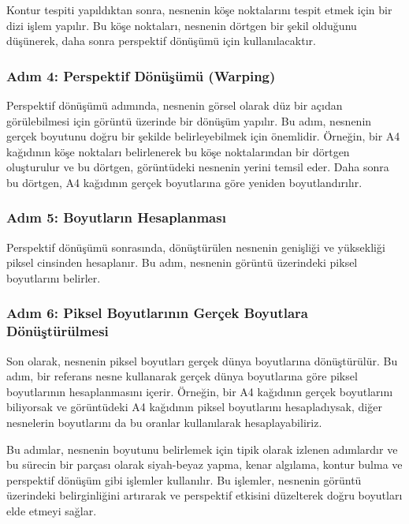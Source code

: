 \documentclass[11pt,a4paper]{report}
\begin{document}
\begin{justify}
   Kontur tespiti yapıldıktan sonra, nesnenin köşe noktalarını tespit etmek için bir dizi işlem yapılır. Bu köşe noktaları, nesnenin dörtgen bir şekil olduğunu düşünerek, daha sonra perspektif dönüşümü için kullanılacaktır.
   
   \subsubsection{Adım 4: Perspektif Dönüşümü (Warping)}
   Perspektif dönüşümü adımında, nesnenin görsel olarak düz bir açıdan görülebilmesi için görüntü üzerinde bir dönüşüm yapılır. Bu adım, nesnenin gerçek boyutunu doğru bir şekilde belirleyebilmek için önemlidir. Örneğin, bir A4 kağıdının köşe noktaları belirlenerek bu köşe noktalarından bir dörtgen oluşturulur ve bu dörtgen, görüntüdeki nesnenin yerini temsil eder. Daha sonra bu dörtgen, A4 kağıdının gerçek boyutlarına göre yeniden boyutlandırılır.
   
   \subsubsection{Adım 5: Boyutların Hesaplanması}
   Perspektif dönüşümü sonrasında, dönüştürülen nesnenin genişliği ve yüksekliği piksel cinsinden hesaplanır. Bu adım, nesnenin görüntü üzerindeki piksel boyutlarını belirler.
   \newline
   
   \subsubsection{Adım 6: Piksel Boyutlarının Gerçek Boyutlara Dönüştürülmesi}
   Son olarak, nesnenin piksel boyutları gerçek dünya boyutlarına dönüştürülür. Bu adım, bir referans nesne kullanarak gerçek dünya boyutlarına göre piksel boyutlarının hesaplanmasını içerir. Örneğin, bir A4 kağıdının gerçek boyutlarını biliyorsak ve görüntüdeki A4 kağıdının piksel boyutlarını hesapladıysak, diğer nesnelerin boyutlarını da bu oranlar kullanılarak hesaplayabiliriz.
   \newline
   
   Bu adımlar, nesnenin boyutunu belirlemek için tipik olarak izlenen adımlardır ve bu sürecin bir parçası olarak siyah-beyaz yapma, kenar algılama, kontur bulma ve perspektif dönüşüm gibi işlemler kullanılır. Bu işlemler, nesnenin görüntü üzerindeki belirginliğini artırarak ve perspektif etkisini düzelterek doğru boyutları elde etmeyi sağlar.\cite{Nesne-Boyutunu-Bulma-Adımları}
   \newpage
   \end{justify}
   
\end{document}
